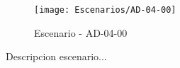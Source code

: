 \begin{figure}[H]
\centering
\texttt{[image: Escenarios/AD-04-00]}
\caption{Escenario - AD-04-00}
\label{fig:AD-04-00}
\end{figure}

Descripcion escenario...
\clearpage
